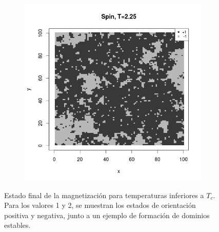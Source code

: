 \documentclass{scrartcl}
\begin{document}
\begin{figure}[ht]
\begin{subfigure}{.35\textwidth}
\end{subfigure}%
\begin{subfigure}{.35\textwidth}
  \centering
  \includegraphics[width=1\linewidth]{spins/spinT2_25}
\end{subfigure}
\caption{Estado final de la magnetización para temperaturas inferiores a $T_c$. Para los valores 1 y 2, se muestran los estados de orientación positiva y negativa, junto a un ejemplo de formación de dominios estables.}
\label{fig:spinsmenorTc}
\end{figure}
\end{document}
